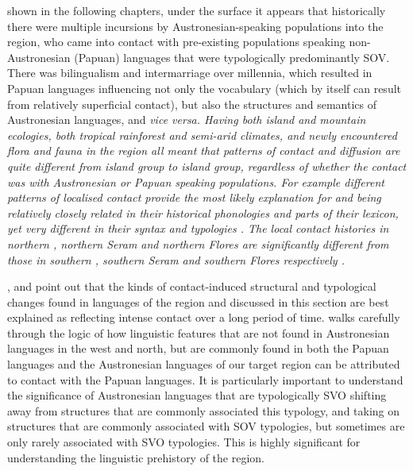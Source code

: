  shown in the following chapters,
under the surface it appears that historically there were multiple
incursions by Austronesian-speaking populations into the region,
who came into contact with pre-existing populations speaking
non-Austronesian (Papuan) languages that were typologically predominantly SOV.
There was bilingualism and intermarriage over millennia,
which resulted in Papuan languages influencing not only the vocabulary
(which by itself can result from relatively superficial contact),
but also the structures
and semantics of Austronesian languages, and \it{vice versa}.
Having both island and mountain ecologies, both tropical rainforest
and semi-arid climates, and newly encountered flora
and fauna in the region all meant that patterns of contact
and diffusion are quite different from island group to island
group, regardless of whether the contact was with Austronesian or Papuan speaking populations.
For example different patterns of localised contact provide the
most likely explanation for 
and  being relatively closely related in their historical
phonologies and parts of their lexicon,
yet very different in their syntax and typologies \citep{Grimes2010a}.
The local contact histories in northern ,
northern Seram and northern Flores are significantly different
from those in southern ,
southern Seram and southern Flores respectively
\citep[11]{Grimes2000a,GrimesTherikGrimesJacob1997}.

\citet{ThomasonKaufman1988,Schapper2015,Klamer2019}, and
\citet{GrimesCIP} point out that the kinds of contact-induced
structural and typological changes found in languages of the region
and discussed in this section are best explained as reflecting
intense contact over a long period of time.
\citet[14--16]{Klamer2019} walks carefully through the logic of how
linguistic features that are not found in Austronesian languages
in the west and north, but are commonly found in both the Papuan languages
and the Austronesian languages of our target region can be attributed
to contact with the Papuan languages.
It is particularly important to understand the significance of
Austronesian languages that are typologically SVO shifting away
from structures that are commonly associated this typology,
and taking on structures that are commonly associated
with SOV typologies, but sometimes are only rarely associated with SVO typologies.
This is highly significant for understanding the linguistic prehistory of the region.

